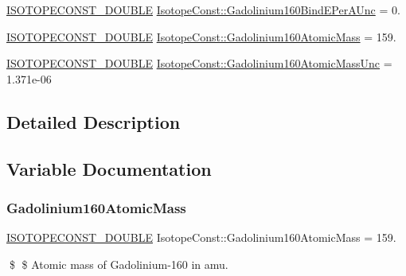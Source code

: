 \begin{DoxyCompactItemize}
\item 
\mbox{\hyperlink{group___isotope_const-_macros_ga8f45a7272ce02c0b4c65c44636ed719a}{I\+S\+O\+T\+O\+P\+E\+C\+O\+N\+S\+T\+\_\+\+D\+O\+U\+B\+LE}} \mbox{\hyperlink{group___isotope_const-_gadolinium-_gd160_gae8bf27e4ea4e1df41e58b44e2fc058f2}{Isotope\+Const\+::\+Gadolinium160\+Bind\+E\+Per\+A\+Unc}} = 0.
\item 
\mbox{\hyperlink{group___isotope_const-_macros_ga8f45a7272ce02c0b4c65c44636ed719a}{I\+S\+O\+T\+O\+P\+E\+C\+O\+N\+S\+T\+\_\+\+D\+O\+U\+B\+LE}} \mbox{\hyperlink{group___isotope_const-_gadolinium-_gd160_ga811621ed284436a00480ccee97c5aa5f}{Isotope\+Const\+::\+Gadolinium160\+Atomic\+Mass}} = 159.
\item 
\mbox{\hyperlink{group___isotope_const-_macros_ga8f45a7272ce02c0b4c65c44636ed719a}{I\+S\+O\+T\+O\+P\+E\+C\+O\+N\+S\+T\+\_\+\+D\+O\+U\+B\+LE}} \mbox{\hyperlink{group___isotope_const-_gadolinium-_gd160_ga13c20f5fa88c510b6f569419e72ec9b6}{Isotope\+Const\+::\+Gadolinium160\+Atomic\+Mass\+Unc}} = 1.\+371e-\/06
\end{DoxyCompactItemize}


\subsection{Detailed Description}


\subsection{Variable Documentation}
\mbox{\label{group___isotope_const-_gadolinium-_gd160_ga811621ed284436a00480ccee97c5aa5f}} 
\subsubsection{\texorpdfstring{Gadolinium160\+Atomic\+Mass}{Gadolinium160AtomicMass}}
{\footnotesize\ttfamily \mbox{\hyperlink{group___isotope_const-_macros_ga8f45a7272ce02c0b4c65c44636ed719a}{I\+S\+O\+T\+O\+P\+E\+C\+O\+N\+S\+T\+\_\+\+D\+O\+U\+B\+LE}} Isotope\+Const\+::\+Gadolinium160\+Atomic\+Mass = 159.}

\$ \$ Atomic mass of Gadolinium-\/160 in amu. \mbox{\label{group___isotope_const-_gadolinium-_gd160_ga13c20f5fa88c510b6f569419e72ec9b6}} 
